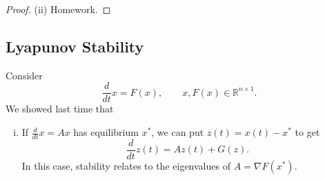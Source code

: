 \documentclass{tufte-handout}
\newcommand*\R{\mathbb{R}}
\theoremstyle{definition}
\begin{document}
\begin{proof}

	(ii) Homework.
\end{proof}

\subsection{Lyapunov Stability}
Consider \[
	\frac{d}{dt}x = F(x), \qquad x,F(x) \in \R^{n\times 1}
.\] 
We showed last time that
\begin{enumerate}[(i)]
	\item If $\frac{d}{dt}x = Ax$ has equilibrium $x^*$, we can put $z(t) = x(t) - x^*$ to get \[
		\frac{d}{dt}z(t) = Az(t) + G(z)
	.\] In this case, stability relates to the eigenvalues of $A = \nabla F(x^*)$.
\end{enumerate}
\end{document}
